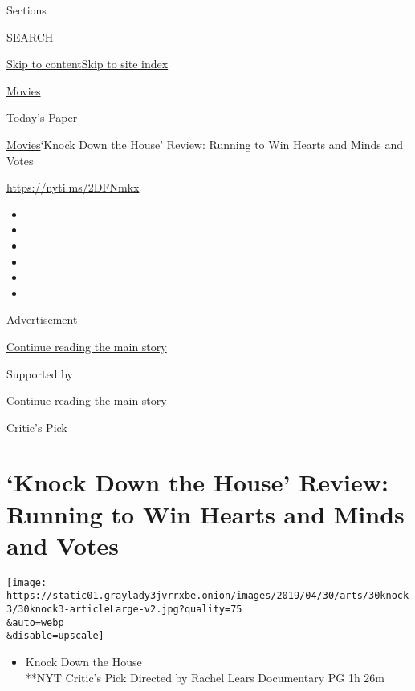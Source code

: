 Sections

SEARCH

\protect\hyperlink{site-content}{Skip to
content}\protect\hyperlink{site-index}{Skip to site index}

\href{https://www.nytimes3xbfgragh.onion/section/movies}{Movies}

\href{https://myaccount.nytimes3xbfgragh.onion/auth/login?response_type=cookie\&client_id=vi}{}

\href{https://www.nytimes3xbfgragh.onion/section/todayspaper}{Today's
Paper}

\href{/section/movies}{Movies}\textbar{}`Knock Down the House' Review:
Running to Win Hearts and Minds and Votes

\href{https://nyti.ms/2DFNmkx}{https://nyti.ms/2DFNmkx}

\begin{itemize}
\item
\item
\item
\item
\item
\item
\end{itemize}

Advertisement

\protect\hyperlink{after-top}{Continue reading the main story}

Supported by

\protect\hyperlink{after-sponsor}{Continue reading the main story}

Critic's Pick

\hypertarget{knock-down-the-house-review-running-to-win-hearts-and-minds-and-votes}{%
\section{`Knock Down the House' Review: Running to Win Hearts and Minds
and
Votes}\label{knock-down-the-house-review-running-to-win-hearts-and-minds-and-votes}}

\texttt{[image: https://static01.graylady3jvrrxbe.onion/images/2019/04/30/arts/30knock3/30knock3-articleLarge-v2.jpg?quality=75\\\&auto=webp\\\&disable=upscale]}

\begin{itemize}
\tightlist
\item
  Knock Down the House\\
  **NYT Critic's Pick Directed by Rachel Lears Documentary PG 1h 26m
\end{itemize}

